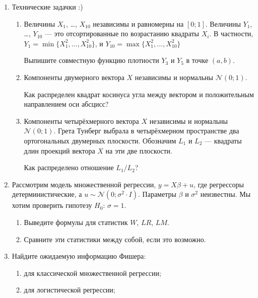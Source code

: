 \documentclass[12pt]{article} %
\theoremstyle{definition} %
\def \cN{\mathcal{N}}
\begin{document}
\begin{enumerate}

\item Технические задачки :)

\begin{enumerate}
  \item Величины $X_1$, \ldots, $X_{10}$ независимы и равномерны на $[0;1]$. 
  Величины $Y_1$, \ldots, $Y_{10}$ — это отсортированные по возрастанию квадраты $X_i$. 
  В частности, $Y_1 = \min \{X_1^2, \ldots, X_{10}^2\}$, и $Y_{10} = \max \{X_1^2, \ldots, X_{10}^2\}$

  Выпишите совместную функцию плотности $Y_3$ и $Y_5$ в точке $(a, b)$.

  \item Компоненты двумерного вектора $X$ независимы и нормальны $\cN(0;1)$. 
  
  Как распределен квадрат косинуса угла между вектором и положительным направлением оси абсцисс?

  \item Компоненты четырёхмерного вектора $X$ независимы и нормальны $\cN(0;1)$. 
  Грета Тунберг выбрала в четырёхмерном пространстве два ортогональных двумерных плоскости. 
  Обозначим $L_1$ и $L_2$ — квадраты длин проекций вектора $X$ на эти две плоскости. 

  Как распределено отношение $L_1 / L_2$?
\end{enumerate}



\item Рассмотрим модель множественной регрессии, $y=X\beta + u$, где регрессоры детерминистические, а $u \sim \cN(0; \sigma^2 \cdot I)$.
Параметры $\beta$ и $\sigma^2$ неизвестны. Мы хотим проверить гипотезу $H_0$: $\sigma = 1$.


\begin{enumerate}
\item Выведите формулы для статистик $W$, $LR$, $LM$.
\item Сравните эти статистики между собой, если это возможно. 
\end{enumerate}


\item Найдите ожидаемую информацию Фишера:
\begin{enumerate}
  \item для классической множественной регрессии;
  \item для логистической регрессии; 
\end{enumerate}



\end{enumerate}
\end{document}
